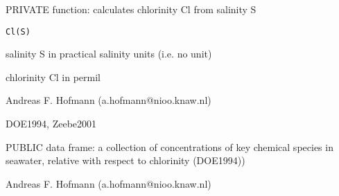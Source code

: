 \documentclass{article}
\begin{document}
\begin{Description}\relax
PRIVATE function: calculates chlorinity Cl from salinity S
\end{Description}
\begin{Usage}
\begin{verbatim}Cl(S)\end{verbatim}
\end{Usage}
\begin{Arguments}
\begin{ldescription}
\item[\code{S }] salinity S in practical salinity units (i.e. no unit)
\end{ldescription}
\end{Arguments}
\begin{Value}
chlorinity Cl in permil
\end{Value}
\begin{Author}\relax
Andreas F. Hofmann (a.hofmann@nioo.knaw.nl)
\end{Author}
\begin{References}\relax
DOE1994, Zeebe2001
\end{References}

\begin{Description}\relax
PUBLIC data frame: a collection of concentrations of key chemical species in seawater, relative with respect to chlorinity (DOE1994))
\end{Description}
\begin{Author}\relax
Andreas F. Hofmann (a.hofmann@nioo.knaw.nl)
\end{Author}
\end{document}
